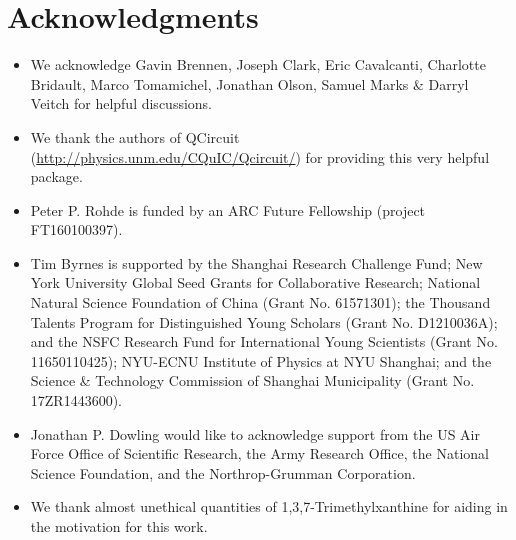 %
%

\section*{Acknowledgments}

\begin{itemize}
\item We acknowledge Gavin Brennen, Joseph Clark, Eric Cavalcanti, Charlotte Bridault, Marco Tomamichel, Jonathan Olson, Samuel Marks \& Darryl Veitch  for helpful discussions.
\item We thank the authors of QCircuit (\href{http://physics.unm.edu/CQuIC/Qcircuit/}{http://physics.unm.edu/CQuIC/Qcircuit/}) for providing this very helpful package.
\item Peter P. Rohde is funded by an ARC Future Fellowship (project FT160100397).
\item Tim Byrnes is supported by the Shanghai Research Challenge Fund; New York University Global Seed Grants for Collaborative Research; National Natural Science Foundation of China (Grant No. 61571301); the Thousand Talents Program for Distinguished Young Scholars (Grant No. D1210036A); and the NSFC Research Fund for International Young Scientists (Grant No. 11650110425); NYU-ECNU Institute of Physics at NYU Shanghai; and the Science \& Technology Commission of Shanghai Municipality (Grant No. 17ZR1443600).
\item Jonathan P. Dowling would like to acknowledge support from the US Air Force Office of Scientific Research, the Army Research Office, the National Science Foundation, and the Northrop-Grumman Corporation.
\item We thank almost unethical quantities of 1,3,7-Trimethylxanthine for aiding in the motivation for this work.
\end{itemize}